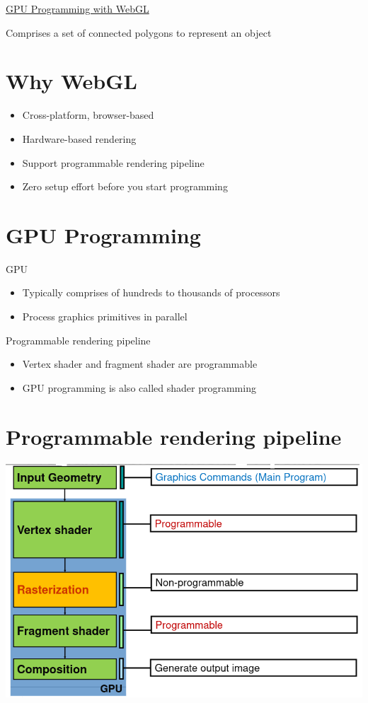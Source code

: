 \documentclass{article}[18pt]
\begin{document}
\begin{center}
\underline{\huge GPU Programming with WebGL}
\end{center}
\begin{defin}
Comprises a set of connected polygons to represent an object
\end{defin}
\section{Why WebGL}
\begin{itemize}
	\item Cross-platform, browser-based
	\item Hardware-based rendering
	\item Support programmable rendering pipeline
	\item Zero setup effort before you start programming
\end{itemize}
\section{GPU Programming}
GPU
\begin{itemize}
	\item Typically comprises of hundreds to thousands of processors
	\item Process graphics primitives in parallel
\end{itemize}
Programmable rendering pipeline
\begin{itemize}
	\item Vertex shader and fragment shader are programmable
	\item GPU programming is also called shader programming
\end{itemize}
\section{Programmable rendering pipeline}
\begin{center}
	\includegraphics[scale=0.7]{pipeline}
\end{center}
\end{document}
